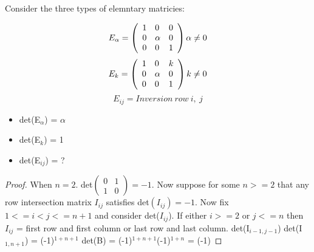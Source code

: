 Consider the three types of elemntary matricies:

\[ E_\alpha = \left( \begin{array}{lll} 1 & 0 & 0 \\ 0 & \alpha & 0 \\ 0 & 0 & 1 \end{array} \right) \\ \alpha \neq 0\]
\[ E_k = \left( \begin{array}{lll} 1 & 0 & k \\ 0 & \alpha & 0 \\ 0 & 0 & 1 \end{array} \right) \\ k \neq 0\]
\[ E_{ij} = Inversion\ row\ i,\ j \]
\begin{itemize}
\item det(E$_\alpha$) = $\alpha$
\item det(E$_k$) = 1
\item det(E$_{ij}$) = ?
\end{itemize}
\begin{proof}
When $n = 2$. det$\left( \begin{array}{ll} 0 & 1 \\ 1 & 0 \end{array} \right) = -1 $. Now suppose for some $n >= 2$ that any row intersection matrix $I_{ij}$ satisfies det$(I_{ij}) = -1$. Now fix $1<= i < j <= n+1 $ and consider det($I_{ij}$). If either $i>=2$ or $j<=n$ then $I_{ij}$ = first row and first column or last row and last column.
det(I$_{i-1,j-1}$)
det(I$_{1, n+1}$) = (-1)$^{1+n+1}$ det(B) = (-1)$^{1+n+1}$(-1)$^{1+n}$ = (-1)
\end{proof}


